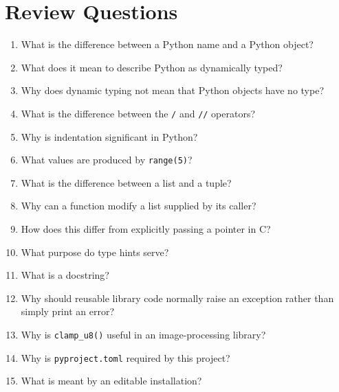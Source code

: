 \section{Review Questions}
\label{sec:ch03-review}

\begin{enumerate}

    \item What is the difference between a Python name and a Python
    object?

    \item What does it mean to describe Python as dynamically typed?

    \item Why does dynamic typing not mean that Python objects have no
    type?

    \item What is the difference between the \texttt{/} and
    \texttt{//} operators?

    \item Why is indentation significant in Python?

    \item What values are produced by \texttt{range(5)}?

    \item What is the difference between a list and a tuple?

    \item Why can a function modify a list supplied by its caller?

    \item How does this differ from explicitly passing a pointer in C?

    \item What purpose do type hints serve?

    \item What is a docstring?

    \item Why should reusable library code normally raise an
    exception rather than simply print an error?

    \item Why is \texttt{clamp\_u8()} useful in an image-processing
    library?

    \item Why is \texttt{pyproject.toml} required by this project?

    \item What is meant by an editable installation?


\end{enumerate}
